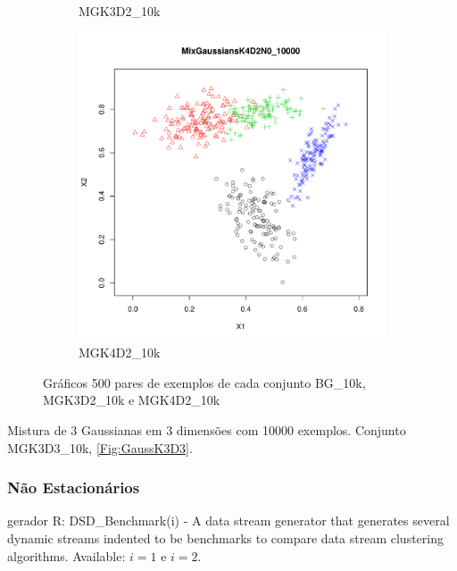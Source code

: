 \begin{figure}[!htb]
\begin{subfigure}[t]{0.4\textwidth}
                \caption{MGK3D2\_10k}
                \label{Fig:GaussK3D2}
        \end{subfigure}
        \qquad %
        \begin{subfigure}[t]{0.4\textwidth}
                \includegraphics[width=\textwidth]{figures/datasets/MixGaussiansK4D2N0_10000}
                \caption{MGK4D2\_10k}
                \label{Fig:GaussK4D2}
        \end{subfigure}
        \caption{Gráficos 500 pares de exemplos de cada conjunto BG\_10k, MGK3D2\_10k e MGK4D2\_10k}\label{Fig:SinteticosEstaticos}
\end{figure}

Mistura de 3 Gaussianas em 3 dimensões com 10000 exemplos. Conjunto MGK3D3\_10k, \autoref{Fig:GaussK3D3}.

\subsubsection*{Não Estacionários}

gerador R: DSD\_Benchmark(i) - A data stream generator that generates several dynamic streams indented to be benchmarks to compare data stream clustering algorithms. Available: $i = 1$ e $i = 2$.

